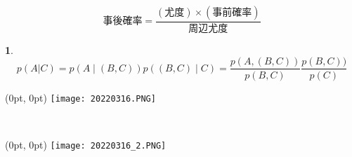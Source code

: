 \documentclass[dvipdfmx,cjk]{beamer} %
\theoremstyle{example}
\newtheorem{prob}[thm]{}
\begin{document}
\begin{frame}
    $$\mbox{事後確率}=\displaystyle \frac{(\mbox{尤度})×(\mbox{事前確率})}{\mbox{周辺尤度}}$$
    \begin{prob}
    $$p(A|C)={p(A\mid(B,C))}p((B,C)\mid C) =\displaystyle \frac{p(A,(B,C))}{p(B,C)}\frac{p(B,C))}{p(C)}$$
    \end{prob}
\end{frame}

\begin{frame}
\begin{textblock*}{1\linewidth}(0pt, 0pt)
\centering  \texttt{[image: 20220316.PNG]}
\end{textblock*}　 

\end{frame}
\begin{frame}
\begin{textblock*}{1\linewidth}(0pt, 0pt)
\centering  \texttt{[image: 20220316\_2.PNG]}
\end{textblock*}　 

\end{frame}
\end{document}
